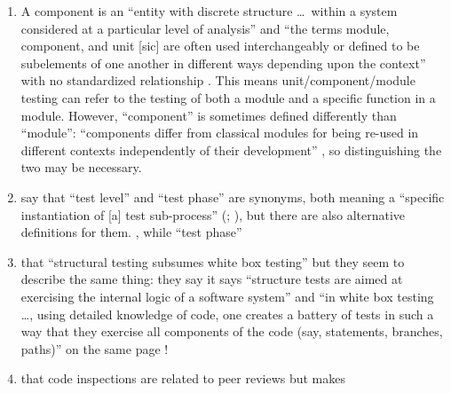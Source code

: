 \begin{enumerate}
    \item %
          A component is an ``entity with discrete structure \dots\ within a
          system considered at a particular level of analysis''
          \citep{ISO_IEC2023b} and ``the terms module, component, and unit
              [sic] are often used interchangeably or defined to be subelements
          of one another in different ways depending upon the context'' with
          no standardized relationship \citep[p.~82]{IEEE2017}. This means
          unit/component/module testing can refer to the testing of both a
          module and a specific function in a module.
          However, ``component'' is sometimes defined differently than
          ``module'': ``components differ from classical modules for being
          re-used in different contexts independently of their development''
          \citep[p.~107]{BaresiAndPezzè2006}, so distinguishing the two
          may be necessary.
          \ifnotpaper
    \item %
          \citeauthor*{IEEE2017} say that ``test level'' and ``test phase''
          are synonyms, both meaning a ``specific instantiation of [a] test
          sub-process'' (\citeyear[pp.~469,~470]{IEEE2017}; \citeyear[p.~9]{IEEE2013}),
          but there are also alternative definitions for them.
          \procLevel{\citeyearpar}, while ``test phase'' \phaseDef{}
          \fi
    \item %
           \citeauthor{PetersAndPedrycz2000} 
          that ``structural testing
          subsumes white box testing'' but they seem to describe the same thing:
          \ifnotpaper they say \else it says \fi ``structure tests are aimed at
          exercising the internal logic of a software system'' and ``in white box
          testing \dots, using detailed knowledge of code, one creates a battery of
          tests in such a way that they exercise all components of the code
          (say, statements, branches, paths)'' on the same page
          \citeyearpar[p.~447]{PetersAndPedrycz2000}!
    \item %
           \citetISTQB{}  that code inspections
          are related to peer reviews but \citet[pp.~94-95]{Patton2006} makes

\end{enumerate}
